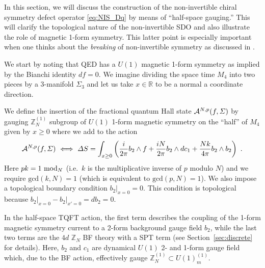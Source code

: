 \documentclass[11pt]{article}
\def\CA{{\cal A}}
\def\IR{{\mathbb{R}}}
\def\IZ{{\mathbb{Z}}}
\def\beq{\begin{equation}}
\def\eeq{\end{equation}}
\begin{document}
In this section, we will discuss the construction of the non-invertible chiral symmetry defect operator \eqref{eq:NIS_Dq} by means of ``half-space gauging.''  
This will clarify the topological nature of the non-invertible SDO and also illustrate the role of magnetic 1-form symmetry. This latter point is especially important when one thinks about the \emph{breaking} of non-invertible symmetry as discussed in \cite{Cordova:2022ieu,Cordova:2022fhg}. 

We start by noting that QED has a $U(1)$ magnetic 1-form symmetry as implied by the Bianchi identity $d f = 0$. We imagine dividing the space time $M_4$ into two pieces by a 3-manifold $\Sigma_3$ and let us take $x\in \IR$ to be a normal a coordinate direction.  

We define the insertion of the fractional quantum Hall state $\CA^{N,p}(f,\Sigma)$ by gauging $\IZ_N^{(1)}$ subgroup of $U(1)$ 1-form magnetic symmetry on the ``half'' of $M_4$ given by $x \geq 0$ where we add to the action  
%
\beq
\CA^{N,p}(f,\Sigma)~\Longleftrightarrow~
\Delta S =
 \int_{x\geq0}\left( \frac{i}{2\pi} b_2 \wedge f + \frac{iN}{2\pi} b_2 \wedge d c_1 + \frac{Nk}{4\pi} b_2 \wedge b_2 \right)~.
\label{eq:NIS_half_space_gauging}
\eeq
%
Here $pk=1~{\rm mod}_N$ (i.e.~$k$ is the multiplicative inverse of $p$ modulo $N$) and we require $\text{gcd} (k, N) = 1$ (which is equivalent to $\text{gcd} (p, N) = 1$). We also impose a topological boundary condition $b_2 \vert_{x=0} = 0$. This condition is topological because $b_2 \vert_{x=0} - b_2 \vert_{x'=0} = d b_2 = 0$.

In the half-space TQFT action, the first term describes the coupling of the 1-form magnetic symmetry current to a 2-form background gauge field $b_2$, while the last two terms are the $4d$ $\IZ_N$ BF theory with a SPT term (see Section~\ref{sec:discrete} for details). Here, $b_2$ and $c_1$ are dynamical $U(1)$ 2- and 1-form gauge field which, due to the BF action, effectively gauge $\IZ_N^{(1)} \subset U(1)_m^{(1)}$.
\end{document}
